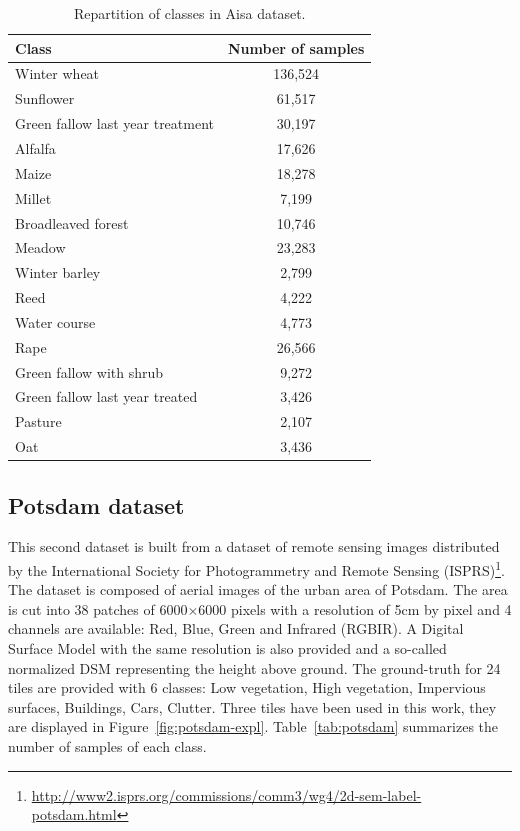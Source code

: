 \documentclass[journal,peerreview,onecolumn]{IEEEtran}
\begin{document}
    \begin{table}[!t]
        \centering
        \caption{Repartition of classes in Aisa dataset.\label{tab:aisa}}
        \begin{tabular}[b]{lc}\toprule
          Class & Number of samples \\ \midrule
          Winter wheat & 136,524 \\
          Sunflower & 61,517 \\
          Green fallow last year treatment & 30,197 \\
          Alfalfa & 17,626 \\
          Maize & 18,278 \\
          Millet & 7,199 \\
          Broadleaved forest & 10,746 \\
          Meadow & 23,283 \\
          Winter barley & 2,799 \\
          Reed & 4,222 \\
          Water course & 4,773 \\
          Rape & 26,566 \\
          Green fallow with shrub & 9,272 \\
          Green fallow last year treated & 3,426 \\
          Pasture & 2,107 \\
          Oat & 3,436 \\ \bottomrule
        \end{tabular}
    \end{table}

    \subsection{Potsdam dataset}
    \label{sec:pots-dataset}

    This  second dataset  is built  from a  dataset of  remote sensing
    images distributed by the International Society for Photogrammetry
    and                         Remote                         Sensing
    (ISPRS)\footnote{\url{http://www2.isprs.org/commissions/comm3/wg4/2d-sem-label-potsdam.html}}. The
    dataset is composed of aerial images of the urban area of Potsdam.
    The area is cut into 38  patches of 6000$\times$6000 pixels with a
    resolution  of 5cm  by pixel  and 4  channels are  available: Red,
    Blue, Green  and Infrared (RGBIR).   A Digital Surface  Model with
    the same  resolution is also  provided and a  so-called normalized
    DSM representing the height above  ground. The ground-truth for 24
    tiles  are   provided  with   6  classes:  Low   vegetation,  High
    vegetation, Impervious surfaces,  Buildings, Cars, Clutter.  Three
    tiles  have  been  used  in  this  work,  they  are  displayed  in
    Figure~\ref{fig:potsdam-expl}.  Table~\ref{tab:potsdam} summarizes
    the  number of  samples of  each class.
\end{document}

